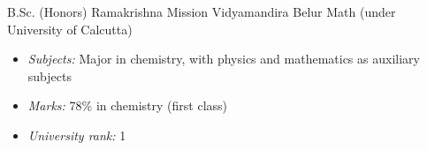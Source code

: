         {B.Sc. (Honors)}
        {Ramakrishna Mission Vidyamandira}
        {Belur Math (under University of Calcutta)}
        {}
        {\vspace{-1.0em}%
         \begin{itemize}%
         \setlength{\itemsep}{0.35em}
              \item {\itshape\color{color2} Subjects:} %
                    Major in chemistry, with physics and mathematics as auxiliary subjects
              \item {\itshape\color{color2} Marks:} 78\% in chemistry (first class)
              \item {\itshape\color{color2} University rank:} 1
         \end{itemize}
        }


